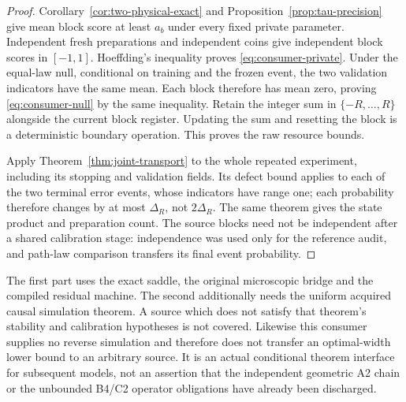\begin{proof}
Corollary~\ref{cor:two-physical-exact} and
Proposition~\ref{prop:tau-precision} give mean block score at least $a_b$
under every fixed private parameter. Independent fresh preparations and
independent coins give independent block scores in $[-1,1]$.
Hoeffding's inequality proves \eqref{eq:consumer-private}. Under the
equal-law null, conditional on training and the frozen event, the two
validation indicators have the same mean. Each block therefore has
mean zero, proving \eqref{eq:consumer-null} by the same inequality.
Retain the integer sum in $\{-R,\ldots,R\}$ alongside the current block
register. Updating the sum and resetting the block is a deterministic
boundary operation. This proves the raw resource bounds.

Apply Theorem~\ref{thm:joint-transport} to the whole repeated experiment,
including its stopping and validation fields. Its defect bound applies
to each of the two terminal error events, whose indicators have range
one; each probability therefore changes by at most $\Delta_R$, not
$2\Delta_R$. The same theorem gives the state product and preparation
count. The source blocks need not be independent after a shared
calibration stage: independence was used only for the reference audit,
and path-law comparison transfers its final event probability.
\end{proof}

The first part uses the exact saddle, the original microscopic bridge
and the compiled residual machine. The second additionally needs the
uniform acquired causal simulation theorem. A source which does not
satisfy that theorem's stability and calibration hypotheses is not
covered. Likewise this consumer supplies no reverse simulation and
therefore does not transfer an optimal-width lower bound to an arbitrary
source. It is an actual conditional theorem interface for subsequent
models, not an assertion that the independent geometric A2 chain or
the unbounded B4/C2 operator obligations have already been discharged.
